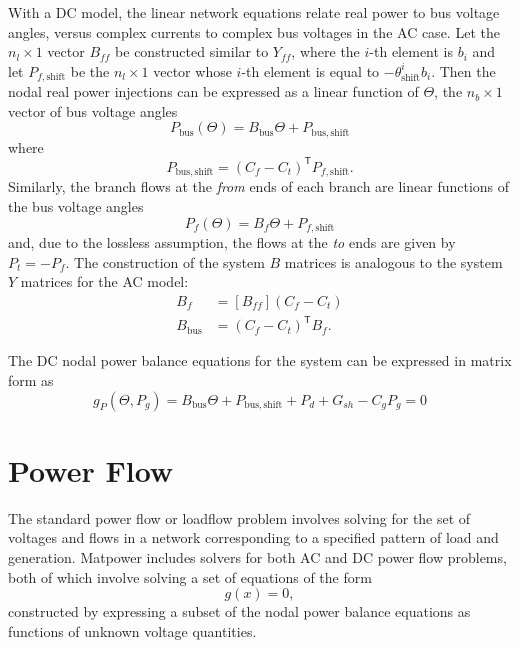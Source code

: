 \documentclass[12pt]{article}
\newcommand{\matpower}[0]{{\sc Matpower}}
\newcommand{\trans}[1]{{#1}^{\ensuremath{\mathsf{T}}}}  %
\newcommand{\diag}[1]{\left[{#1}\right]}                %
\numberwithin{equation}{section}
\numberwithin{table}{section}
\numberwithin{figure}{section}
\begin{document}
With a DC model, the linear network equations relate real power to bus voltage angles, versus complex currents to complex bus voltages in the AC case. Let the $n_l \times 1$ vector $B_{f\!f}$ be constructed similar to $Y_{f\!f}$, where the $i$-th element is $b_i$ and let $P_{f,\mathrm{shift}}$ be the $n_l \times 1$ vector whose $i$-th element is equal to $- \theta_\mathrm{shift}^i b_i$. Then the nodal real power injections can be expressed as a linear function of $\Theta$, the $n_b \times 1$ vector of bus voltage angles
\begin{equation}
P_\mathrm{bus}(\Theta) = B_\mathrm{bus} \Theta + P_\mathrm{bus,shift}
\end{equation}
where
\begin{equation}
P_\mathrm{bus,shift} = \trans{(C_f - C_t)} P_{f,\mathrm{shift}}.
\end{equation}
Similarly, the branch flows at the \emph{from} ends of each branch are linear functions of the bus voltage angles
\begin{equation}
P_f(\Theta) = B_f \Theta + P_{f,\mathrm{shift}}
\label{eq:Pf}
\end{equation}
and, due to the lossless assumption, the flows at the \emph{to} ends are given by $P_t = -P_f$. The construction of the system $B$ matrices is analogous to the system $Y$ matrices for the AC model:
\begin{align}
B_f &= \diag{ B_{f\!f} } (C_f - C_t) \label{eq:Bf} \\
B_\mathrm{bus} &= \trans{(C_f - C_t)} B_f. \label{eq:Bbus}
\end{align}

The DC nodal power balance equations for the system can be expressed in matrix form as
\begin{equation}
g_P(\Theta, P_g) = B_\mathrm{bus} \Theta + P_\mathrm{bus,shift} + P_d + G_{sh} - C_g P_g = 0
\label{eq:dcpf}
\end{equation}


\clearpage
\section{Power Flow}
\label{sec:pf}

The standard power flow or loadflow problem involves solving for the set of voltages and flows in a network corresponding to a specified pattern of load and generation. \matpower{} includes solvers for both AC and DC power flow problems, both of which involve solving a set of equations of the form
\begin{equation}
g(x) = 0,	\label{eq:gx0}
\end{equation}
constructed by expressing a subset of the nodal power balance equations as functions of unknown voltage quantities.
\end{document}
